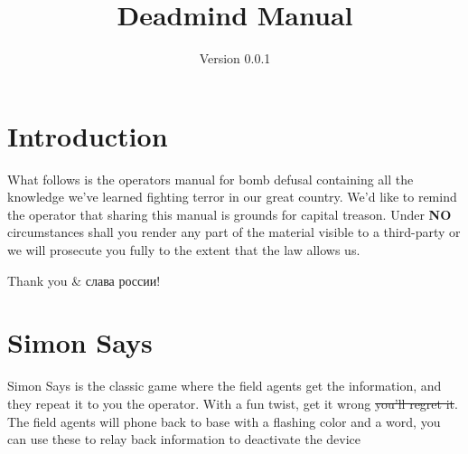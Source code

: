 \documentclass{article}
\title{Deadmind Manual}
\date{Version 0.0.1}
\begin{document}
\BgThispage

\maketitle

\section* {Introduction}
What follows is the operators manual for bomb defusal containing all the knowledge we've learned fighting terror in our great country. We'd like to remind the operator that sharing this manual is grounds for capital treason. Under \textbf{NO} circumstances shall you render any part of the material visible to a third-party or we will prosecute you fully to the extent that the law allows us.

Thank you \& слава россии!

\newpage
\BgThispage



\section* {Simon Says}

Simon Says is the classic game where the field agents get the information, and they repeat it to you the operator. With a fun twist, get it wrong \st{you'll regret it}.\\

The field agents will phone back to base with a flashing color and a word, you can use these to relay back information to deactivate the device
\end{document}
